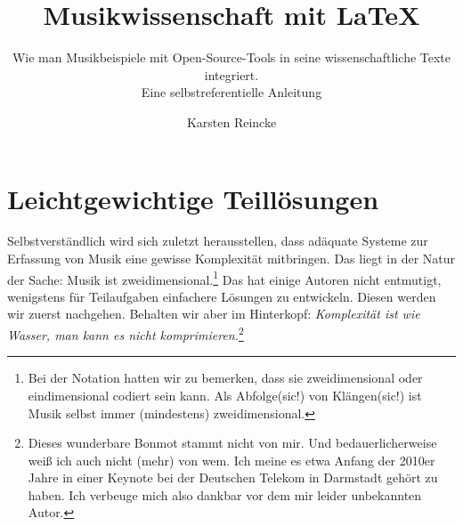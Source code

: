 \documentclass[
  DIV=calc,
  BCOR=5mm,
  11pt,
  headings=small,
  oneside,
  abstract=true,
  toc=bib,
  english,ngerman]{scrartcl}
\newcommand{\acc}[0]{\textit}
\begin{document}
\nocite{*}

\titlehead{\textit{mycsrf} und Musik}
\subject{Release }
\title{Musikwissenschaft mit \LaTeX}
\subtitle{Wie man Musikbeispiele mit Open-Source-Tools 
in seine wissenschaftliche Texte integriert.\\
{\small Eine selbstreferentielle Anleitung}}
\author{Karsten Reincke}


\maketitle



\footnotesize
\tableofcontents

\normalsize





\section{Leichtgewichtige Teillösungen}

Selbstverständlich wird sich zuletzt herausstellen, dass adäquate Systeme zur
Erfassung von Musik eine gewisse Komplexität mitbringen. Das liegt in der Natur
der Sache: Musik ist zweidimensional.\footnote{Bei der Notation hatten wir zu
bemerken, dass sie zweidimensional oder eindimensional codiert sein kann.
Als Abfolge(sic!) von Klängen(sic!) ist Musik selbst immer (mindestens)
zweidimensional.} Das hat einige Autoren nicht entmutigt, wenigstens für
Teilaufgaben einfachere Lösungen zu entwickeln. Diesen werden wir zuerst
nachgehen. Behalten wir aber im Hinterkopf: \acc{Komplexität ist wie Wasser, man
kann es nicht komprimieren.}\footnote{Dieses wunderbare Bonmot stammt nicht von
mir. Und bedauerlicherweise weiß ich auch nicht (mehr) von wem. Ich meine es
etwa Anfang der 2010er Jahre in einer Keynote bei der Deutschen Telekom in
Darmstadt gehört zu haben. Ich verbeuge mich also dankbar vor dem mir leider
unbekannten Autor.}





 
\end{document}
